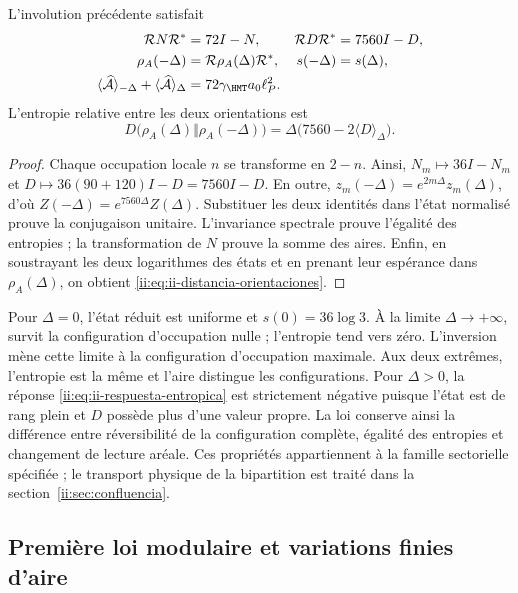 \begin{theorem}
L'involution précédente satisfait
\begin{align}
 \mathcal R N\mathcal R^*&=72I-N,&
 \mathcal R D\mathcal R^*&=7560I-D,\\
 \rho_A(-\Delta)&=\mathcal R\rho_A(\Delta)\mathcal R^*,&
 s(-\Delta)&=s(\Delta),
 \label{ii:eq:ii-inversion-entropia}\\
 \langle\widehat{\mathcal A}\rangle_{-\Delta}
 +\langle\widehat{\mathcal A}\rangle_\Delta
 &=72\gamma_{\HMT}a_0\ell_P^2.&&
 \label{ii:eq:ii-area-complementaria}
\end{align}
L'entropie relative entre les deux orientations est
\begin{equation}
 D\bigl(\rho_A(\Delta)\Vert\rho_A(-\Delta)\bigr)
 =\Delta\bigl(7560-2\langle D\rangle_\Delta\bigr).
 \label{ii:eq:ii-distancia-orientaciones}
\end{equation}
\end{theorem}
\begin{proof}
Chaque occupation locale $n$ se transforme en $2-n$. Ainsi,
$N_m\mapsto36I-N_m$ et
$D\mapsto36(90+120)I-D=7560I-D$.
En outre, $z_m(-\Delta)=e^{2m\Delta}z_m(\Delta)$,
d'où $Z(-\Delta)=e^{7560\Delta}Z(\Delta)$.
Substituer les deux identités dans l'état normalisé prouve la
conjugaison unitaire. L'invariance spectrale prouve l'égalité
des entropies ; la transformation de $N$ prouve la somme des aires.
Enfin, en soustrayant les deux logarithmes des états et en prenant
leur espérance dans $\rho_A(\Delta)$, on obtient
\eqref{ii:eq:ii-distancia-orientaciones}.
\end{proof}

Pour $\Delta=0$, l'état réduit est uniforme et
$s(0)=36\log3$. À la limite $\Delta\to+\infty$, survit
la configuration d'occupation nulle ; l'entropie tend vers zéro.
L'inversion mène cette limite à la configuration d'occupation maximale.
Aux deux extrêmes, l'entropie est la même et l'aire distingue les
configurations. Pour $\Delta>0$, la réponse
\eqref{ii:eq:ii-respuesta-entropica} est strictement négative puisque
l'état est de rang plein et $D$ possède plus d'une valeur propre.
La loi conserve ainsi la différence entre réversibilité de la
configuration complète, égalité des entropies et changement de lecture aréale.
Ces propriétés appartiennent à la famille sectorielle spécifiée ;
le transport physique de la bipartition est traité dans
la section~\ref{ii:sec:confluencia}.

\subsection{Première loi modulaire et variations finies d'aire}
\label{ii:sec:ii-area-ley-modular}

